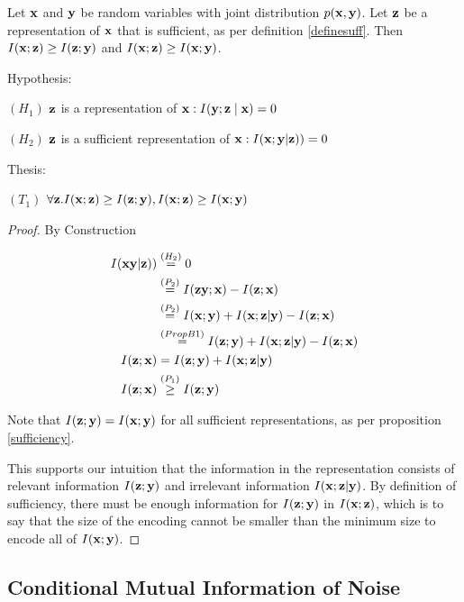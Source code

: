 \begin{lemma}
Let ${\mathbf{x}}$ and ${\mathbf{y}}$ be random variables with joint distribution $p({\mathbf{x}}, {\mathbf{y}})$. Let ${\mathbf{z}}$ be a representation of ${\mathbf{x}}$ that is sufficient, as per definition \ref{definesuff}. Then $I({\mathbf{x}};{\mathbf{z}}) \geq I({\mathbf{z}};{\mathbf{y}})$ and $I({\mathbf{x}};{\mathbf{z}}) \geq I({\mathbf{x}};{\mathbf{y}})$.

Hypothesis:

$(H_1)$ ${\mathbf{z}}$ is a representation of ${\mathbf{x}}: I({\mathbf{y}} ; {\mathbf{z}} \mid {\mathbf{x}})=0$

$(H_2)$ $ {\mathbf{z}}$ is a sufficient representation of ${\mathbf{x}}: I({\mathbf{x}}; {\mathbf{y}}| {\mathbf{z}}))=0$

Thesis:

$(T_1)$ $\forall {\mathbf{z}}.I({\mathbf{x}};{\mathbf{z}}) \geq I({\mathbf{z}};{\mathbf{y}}), I({\mathbf{x}};{\mathbf{z}}) \geq I({\mathbf{x}};{\mathbf{y}})$

\begin{proof}By Construction

$$
\begin{aligned}
I({\mathbf{x}} {\mathbf{y}}|{\mathbf{z}})) &\stackrel{\left(H_2\right)}{=} 0 \\
&\stackrel{\left(P_2\right)}{=} I({\mathbf{z}} {\mathbf{y}}; {\mathbf{x}}) - I({\mathbf{z}}; {\mathbf{x}}) \\
&\stackrel{\left(P_2\right)}{=} I({\mathbf{x}}; {\mathbf{y}}) + I({\mathbf{x}}; {\mathbf{z}}|{\mathbf{y}}) - I({\mathbf{z}}; {\mathbf{x}}) \\
&\stackrel{\left(PropB1\right)}{=} I({\mathbf{z}}; {\mathbf{y}}) + I({\mathbf{x}}; {\mathbf{z}}|{\mathbf{y}}) - I({\mathbf{z}};{\mathbf{x}}) \\
I({\mathbf{z}};{\mathbf{x}}) &= I({\mathbf{z}};{\mathbf{y}}) + I({\mathbf{x}}; {\mathbf{z}}|{\mathbf{y}})\\
I({\mathbf{z}};{\mathbf{x}}) &\stackrel{\left(P_1\right)}{\geq} I({\mathbf{z}}; {\mathbf{y}})\\
\end{aligned}
$$

Note that $I({\mathbf{z}}; {\mathbf{y}}) = I({\mathbf{x}}; {\mathbf{y}})$ for all sufficient representations, as per proposition \ref{sufficiency}.

This supports our intuition that the information in the representation consists of relevant information $I({\mathbf{z}};{\mathbf{y}})$ and irrelevant information $I({\mathbf{x}}; {\mathbf{z}}| {\mathbf{y}})$. By definition of sufficiency, there must be enough information for $I({\mathbf{z}}; {\mathbf{y}})$ in $I({\mathbf{x}}; {\mathbf{z}})$, which is to say that the size of the encoding cannot be smaller than the minimum size to encode all of $I({\mathbf{x}}; {\mathbf{y}})$.

\end{proof}
\label{infobound}
\end{lemma}

\subsection{Conditional Mutual Information of Noise}
\label{app:infonoise}

